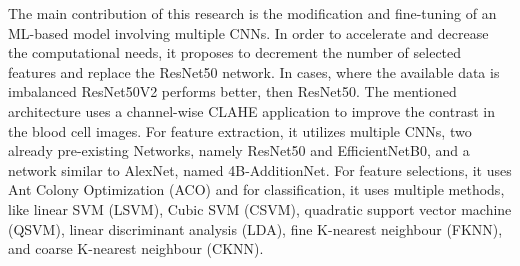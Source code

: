 The main contribution of this research is the modification and fine-tuning of an ML-based model involving multiple CNNs. In order to accelerate and decrease the computational needs, it proposes to decrement the number of selected features and replace the ResNet50 network. In cases, where the available data is imbalanced ResNet50V2 performs better, then ResNet50\cite{ResNet50V2Better}. The mentioned architecture uses a channel-wise CLAHE application to improve the contrast in the blood cell images. For feature extraction, it utilizes multiple CNNs, two already pre-existing Networks, namely ResNet50 and EfficientNetB0, and a network similar to AlexNet, named 4B-AdditionNet. For feature selections, it uses Ant Colony Optimization (ACO) and for classification, it uses multiple methods, like linear SVM (LSVM), Cubic SVM (CSVM), quadratic support vector machine (QSVM), linear discriminant analysis (LDA), fine K-nearest neighbour (FKNN), and coarse K-nearest neighbour (CKNN).
